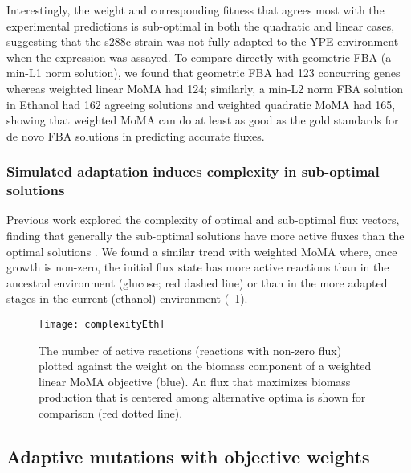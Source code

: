 Interestingly, the weight and corresponding fitness that agrees most
with the experimental predictions is sub-optimal in both the quadratic
and linear cases, suggesting that the s288c strain was not fully
adapted to the YPE environment when the expression was assayed.  To
compare directly with geometric FBA (a min-L1 norm solution), we found
that geometric FBA had 123 concurring genes whereas weighted linear
MoMA had 124; similarly, a min-L2 norm FBA solution in Ethanol had 162
agreeing solutions and weighted quadratic MoMA had 165, showing that
weighted MoMA can do at least as good as the gold standards for de
novo FBA solutions in predicting accurate fluxes.


\subsubsection{Simulated adaptation induces complexity in sub-optimal solutions}

Previous work explored the complexity of optimal and sub-optimal flux
vectors, finding that generally the sub-optimal solutions have more
active fluxes than the optimal solutions \citep{SangLee2012}. We found
a similar trend with weighted MoMA where, once growth is non-zero, the initial flux state
has more active reactions than in the ancestral environment (glucose;
red dashed line) or than in the more adapted stages in the current
(ethanol) environment (\Fig~\ref{fig:complexityEth}).


\begin{figure}
\centering
  \texttt{[image: complexityEth]}
  \caption{The number of active reactions (reactions with non-zero
  flux) plotted against the weight on the biomass component of a
  weighted linear MoMA objective (blue). An flux that maximizes biomass
  production that is centered among alternative optima is shown for
  comparison (red dotted line).}
  \label{fig:complexityEth}
\end{figure}


\subsection{Adaptive mutations with objective weights}

